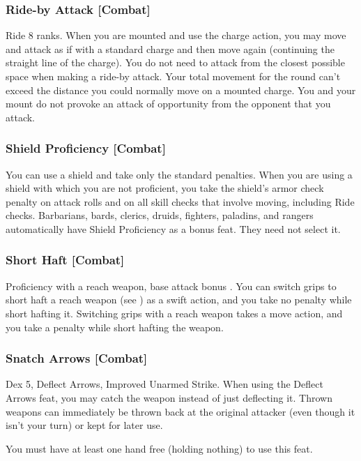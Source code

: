 \subsubsection{Ride-by Attack [Combat]}
\featpre Ride 8 ranks.
 When you are mounted and use the charge action, you may move and attack as if with a standard charge and then move again (continuing the straight line of the charge). You do not need to attack from the closest possible space when making a ride-by attack. Your total movement for the round can't exceed the distance you could normally move on a mounted charge. You and your mount do not provoke an attack of opportunity from the opponent that you attack.

\subsubsection{Shield Proficiency [Combat]}
 You can use a shield and take only the standard penalties.
 When you are using a shield with which you are not proficient, you take the shield's armor check penalty on attack rolls and on all skill checks that involve moving, including Ride checks.
 Barbarians, bards, clerics, druids, fighters, paladins, and rangers automatically have Shield Proficiency as a bonus feat. They need not select it.

\subsubsection{Short Haft [Combat]}
 Proficiency with a reach weapon, base attack bonus .
 You can switch grips to short haft a reach weapon (see ) as a swift action, and you take no penalty while short hafting it.
 Switching grips with a reach weapon takes a move action, and you take a  penalty while short hafting the weapon.

\subsubsection{Snatch Arrows [Combat]}
 Dex 5, Deflect Arrows, Improved Unarmed Strike.
 When using the Deflect Arrows feat, you may catch the weapon instead of just deflecting it. Thrown weapons can immediately be thrown back at the original attacker (even though it isn't your turn) or kept for later use.
\par You must have at least one hand free (holding nothing) to use this feat.%

